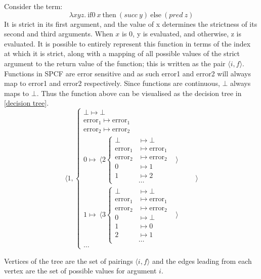\documentclass[12pt,a4paper]{report}
\theoremstyle{definition}
\theoremstyle{definition}
\theoremstyle{remark}
\begin{document}
Consider the term:
\[\lambda xyz.\ \text{if0}\ x\ \text{then}\ (succ\ y)\ \text{else}\ (pred\ z)\]
It is strict in its first argument, and the value of x determines the strictness of its second and third arguments. When $x$ is 0, y is evaluated, and otherwise, z is evaluated. It is possible to entirely represent this function in terms of the index at which it is strict, along with a mapping of all possible values of the strict argument to the return value of the function; this is written as the pair $\langle i, f \rangle$. Functions in SPCF are error sensitive and as such error1 and error2 will always map to error1 and error2 respectively. Since functions are continuous, $\bot$ always maps to $\bot$. Thus the function above can be visualised as the decision tree in \eqref{decision tree}.
\begin{equation}\label{decision tree}
\langle 1, 
\begin{cases}
    \bot \mapsto \bot\\
    \text{error}_1 \mapsto \text{error}_1\\
    \text{error}_2 \mapsto \text{error}_2\\
    0 \mapsto\ \langle 2 \begin{cases}
        \bot &\mapsto \bot\\
        \text{error}_1 &\mapsto \text{error}_1\\
        \text{error}_2 &\mapsto \text{error}_2\\
        0 &\mapsto 1\\
        1 &\mapsto 2\\
          &\dots
    \end{cases} &\rangle\\
    1 \mapsto\ \langle 3 \begin{cases}
        \bot &\mapsto \bot\\
        \text{error}_1 &\mapsto \text{error}_1\\
        \text{error}_2 &\mapsto \text{error}_2\\
        0 &\mapsto \bot\\
        1 &\mapsto 0\\
        2 &\mapsto 1\\
          &\dots
    \end{cases} &\rangle\\
    \dots
\end{cases} \quad\quad\rangle    
\end{equation}

Vertices of the tree are the set of pairings  $\langle i, f \rangle$ and the edges leading from each vertex are the set of possible values for argument $i$. 
\end{document}
